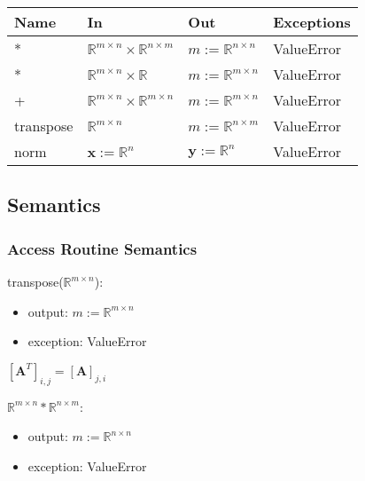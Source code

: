 \documentclass[12pt, titlepage]{article}
\begin{document}
\begin{center}
\begin{tabular}{p{2cm} p{3cm} p{2.5cm} p{4.5cm}}
\hline
\textbf{Name} & \textbf{In} & \textbf{Out} & \textbf{Exceptions} \\
\hline
* & $\mathbb{R}^{m \times n} \times \mathbb{R}^{n \times m}$ & $m:=\mathbb{R}^{n \times n}$ &
ValueError \\
* & $\mathbb{R}^{m \times n} \times \mathbb{R}$ & $m:=\mathbb{R}^{m \times n}$ &
ValueError \\
+ & $\mathbb{R}^{m \times n} \times \mathbb{R}^{m \times n}$ & $m:=\mathbb{R}^{m \times n}$ &
ValueError \\
transpose & $\mathbb{R}^{m \times n}$ & $m:=\mathbb{R}^{n \times m}$ & ValueError
\\
norm & $\mathbf{x}:=\mathbb{R}^n$ & $\mathbf{y}:=\mathbb{R}^n$ & ValueError\\
\hline
\end{tabular}
\end{center}

\subsection{Semantics}

\subsubsection{Access Routine Semantics}

\noindent transpose($\mathbb{R}^{m \times n}$):
\begin{itemize}
\item output: $m:=\mathbb{R}^{m \times n}$
\item exception: ValueError
\end{itemize}

$[\mathbf{A}^T]_{i,j} = [\mathbf{A}]_{j,i}$
\newline

\noindent $\mathbb{R}^{m \times n} * \mathbb{R}^{n \times m}$:
\begin{itemize}
\item output: $m:=\mathbb{R}^{n \times n}$
\item exception: ValueError
\end{itemize}
\end{document}
